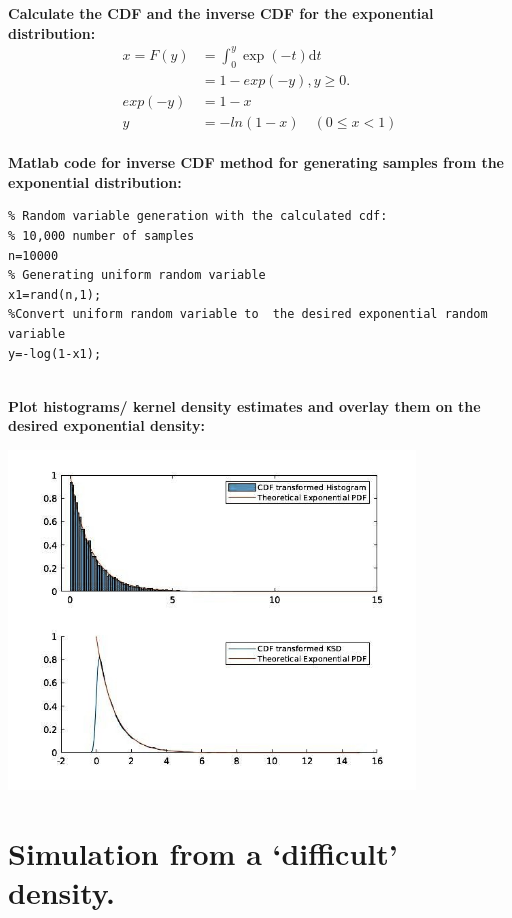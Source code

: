 \documentclass[12pt]{article}
\begin{document}
{\bf Calculate the CDF and the inverse CDF for the exponential distribution:}
\\
{\em
\begin{equation*}
\begin{split}
  x = F(y) & = \int_0^y \mathrm \exp{(-t)} \mathrm dt \\
           & = 1 - exp(-y) , y\geq0. \\
   exp(-y) & = 1-x \\
   y & = -ln(1-x) \quad (0 \leq x < 1)        
\end{split}    
\end{equation*}   
}
\\
{\bf Matlab code for inverse CDF method for generating samples from the exponential distribution:}
\begin{verbatim}
% Random variable generation with the calculated cdf:
% 10,000 number of samples
n=10000
% Generating uniform random variable
x1=rand(n,1);
%Convert uniform random variable to  the desired exponential random variable
y=-log(1-x1);
\end{verbatim}
\\
{\bf Plot histograms/ kernel density estimates and overlay them on the desired exponential density:}

\begin{center}
\includegraphics[width=0.81\textwidth]{cdf-method-exp.jpg}
\end{center}

\section{\bf Simulation from a `difficult'  density.}
\end{document}
